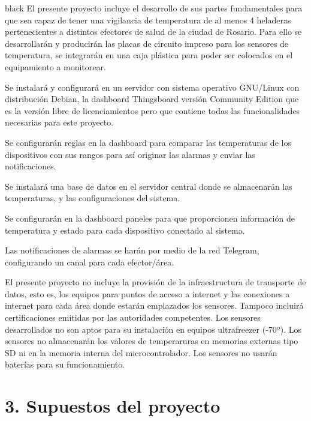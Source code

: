 \documentclass[11pt]{charter}
\begin{document}
\begin{consigna}{black}
El presente proyecto incluye el desarrollo de sus partes fundamentales para que sea capaz de tener una vigilancia de temperatura de al menos 4 heladeras pertenecientes a distintos efectores de salud de la ciudad de Rosario. 
Para ello se desarrollarán y producirán las placas de circuito impreso para los sensores de temperatura, se integrarán en una caja plástica para poder ser colocados en el equipamiento a monitorear.

Se instalará y configurará en un servidor con sistema operativo GNU/Linux con distribución Debian, la dashboard Thingsboard versión Community Edition que es la versión libre de licenciamientos pero que contiene todas las funcionalidades necesarias para este proyecto.

Se configurarán reglas en la dashboard para comparar las temperaturas de los dispositivos con sus rangos para así originar las alarmas y enviar las notificaciones.

Se instalará una base de datos en el servidor central donde se almacenarán las temperaturas, y las configuraciones del sistema.

Se configurarán en la dashboard paneles para que proporcionen información de temperatura y estado para cada dispositivo conectado al sistema.

Las notificaciones de alarmas se harán por medio de la red Telegram, configurando un canal para cada efector/área.


El presente proyecto no incluye la provisión de la infraestructura de transporte de datos, esto es, los equipos para puntos de acceso a internet y las conexiones a internet para cada área donde estarán emplazados los sensores. Tampoco incluirá certificaciones emitidas por las autoridades competentes.
Los sensores desarrollados no son aptos para su instalación en equipos ultrafreezer (-70º).
Los sensores no almacenarán los valores de temperaruras en memorias externas tipo SD ni en la memoria interna del microcontrolador.
Los sensores no usarán baterías para su funcionamiento.

\end{consigna}


\section{3. Supuestos del proyecto}
\label{sec:supuestos}
\end{document}
